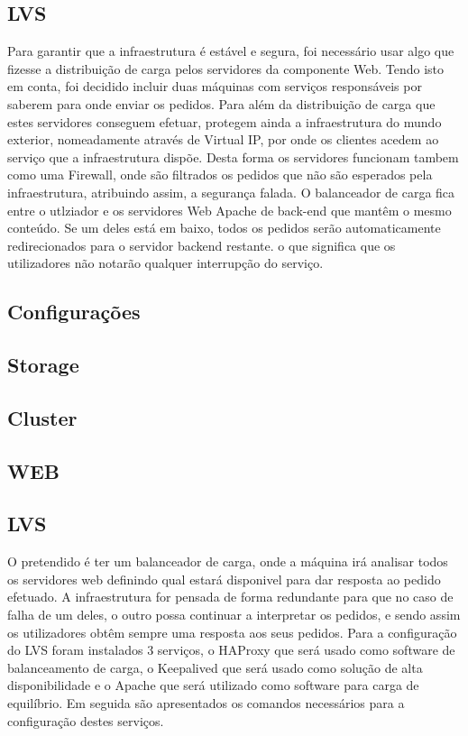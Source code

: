 \subsection{LVS}
Para garantir que a infraestrutura é estável e segura, foi necessário usar algo que fizesse a distribuição de carga pelos servidores da componente Web. Tendo isto em conta, foi decidido incluir duas máquinas com serviços responsáveis por saberem para onde enviar os pedidos. Para além da distribuição de carga que estes servidores conseguem efetuar, protegem ainda a infraestrutura do mundo exterior, nomeadamente através de Virtual IP, por onde os clientes acedem ao serviço que a infraestrutura dispõe. Desta forma os servidores funcionam tambem como uma Firewall, onde são filtrados os pedidos que não são esperados pela infraestrutura, atribuindo assim, a segurança falada.
O balanceador de carga fica entre o utlziador e os servidores Web Apache de back-end que mantêm o mesmo conteúdo. Se um deles está em baixo, todos os pedidos serão automaticamente redirecionados para o servidor backend restante. o que significa que os utilizadores não notarão qualquer interrupção do serviço.

\subsection{Configurações}

\subsection{Storage}

\subsection{Cluster}

\subsection{WEB}

\subsection{LVS}
O pretendido é ter um balanceador de carga, onde a máquina irá analisar todos os servidores web definindo qual estará disponivel para dar resposta ao pedido efetuado.
A infraestrutura for pensada de forma redundante para que no caso de falha de um deles, o outro possa continuar a interpretar os pedidos, e sendo assim os utilizadores obtêm sempre uma resposta aos seus pedidos.
Para a configuração do LVS foram instalados 3 serviços, o HAProxy que será usado como software de balanceamento de carga, o Keepalived que será usado como solução de alta disponibilidade e o Apache que será utilizado como software para carga de equilíbrio. Em seguida são apresentados os comandos necessários para a configuração destes serviços.


